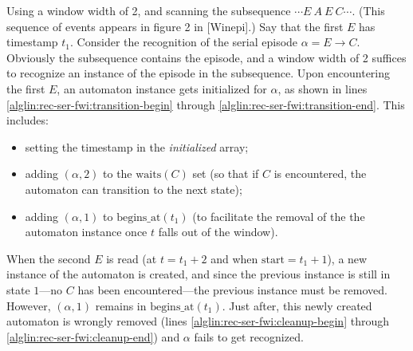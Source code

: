 Using a window width of 2, and scanning the subsequence $ \cdots E \: A \: E \: C \cdots $. (This sequence of events appears in figure 2 in [Winepi].) Say that the first $ E $ has timestamp $ t_1 $. Consider the recognition of the serial episode $ \alpha = E \to C $. Obviously the subsequence contains the episode, and a window width of 2 suffices to recognize an instance of the episode in the subsequence. Upon encountering the first $ E $, an automaton instance gets initialized for $ \alpha $, as shown in lines \ref{alglin:rec-ser-fwi:transition-begin} through \ref{alglin:rec-ser-fwi:transition-end}. This includes:
\begin{itemize}
\item setting the timestamp in the \emph{initialized} array;
\item adding $ (\alpha, 2) $ to the $ \text{waits}(C) $ set (so that if $ C $ is encountered, the automaton can transition to the next state);
\item adding $ (\alpha, 1) $ to $ \text{begins\_at}(t_1) $ (to facilitate the removal of the the automaton instance once $ t $ falls out of the window).
\end{itemize}

When the second $ E $ is read (at $ t = t_1 + 2 $ and when $ \text{start} = t_1 + 1 $), a new instance of the automaton is created, and since the previous instance is still in state $ 1 $---no $ C $ has been encountered---the previous instance must be removed. However, $ (\alpha, 1) $ remains in $ \text{begins\_at}(t_1) $. Just after, this newly created automaton is wrongly removed (lines \ref{alglin:rec-ser-fwi:cleanup-begin} through \ref{alglin:rec-ser-fwi:cleanup-end}) and $ \alpha $ fails to get recognized.
